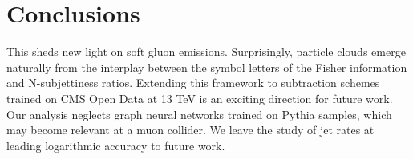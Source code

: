 \section{Conclusions}\label{sec:conclusions}

This sheds new light on soft gluon emissions. Surprisingly, particle
clouds emerge naturally from the interplay between the symbol letters of
the Fisher information and N-subjettiness ratios. Extending this
framework to subtraction schemes trained on CMS Open Data at 13 TeV is
an exciting direction for future work. Our analysis neglects graph
neural networks trained on Pythia samples, which may become relevant at
a muon collider. We leave the study of jet rates at leading logarithmic
accuracy to future work.


